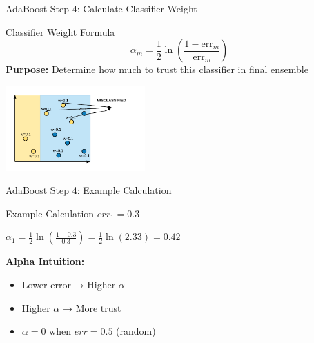 \documentclass[9pt]{beamer}
\newcommand{\fitpic}[1]{\begin{adjustbox}{max width=\linewidth, max totalheight=0.78\textheight}#1\end{adjustbox}}
\begin{document}
\begin{frame}{AdaBoost Step 4: Calculate Classifier Weight}
\begin{definitionbox}{Classifier Weight Formula}
$$\alpha_m = \frac{1}{2}\ln\left(\frac{1 - \text{err}_m}{\text{err}_m}\right)$$
\textbf{Purpose:} Determine how much to trust this classifier in final ensemble
\end{definitionbox}

\begin{center}
\fitpic{\includegraphics[width = 0.4\textwidth]{../assets/ensemble/diagrams/ada_iter1_misclassify}}
\end{center}
\end{frame}

\begin{frame}{AdaBoost Step 4: Example Calculation}
\begin{examplebox}{Example Calculation}
$err_1 = 0.3$

$\alpha_1 = \frac{1}{2}\ln\left(\frac{1-0.3}{0.3}\right) = \frac{1}{2}\ln(2.33) = 0.42$
\end{examplebox}

\begin{keypointsbox}
\textbf{Alpha Intuition:}
\begin{itemize}
\item Lower error → Higher $\alpha$
\item Higher $\alpha$ → More trust
\item $\alpha = 0$ when $err = 0.5$ (random)
\end{itemize}
\end{keypointsbox}
\end{frame}
\end{document}
